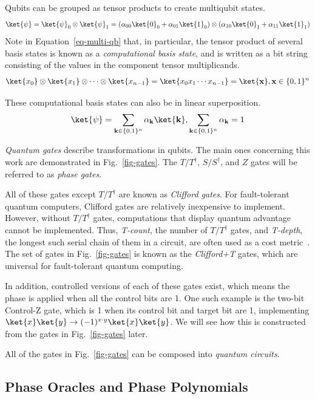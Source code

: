 Qubits can be grouped as tensor products to create multiqubit states.
\begin{equation}
\label{eq-multi-qb}
\ket{\psi} = \ket{\psi}_0 \otimes \ket{\psi}_1 =(\alpha_{00} \ket{0}_0 + \alpha_{01} \ket{1}_0) \otimes
(\alpha_{10} \ket{0}_1 + \alpha_{11} \ket{1}_1)
\end{equation}
Note in Equation~\ref{eq-multi-qb} that, in particular, the tensor product of several basis states is known as a \emph{computational basis state},
and is written as a bit string consisting of the values in the component tensor multiplicands.
\begin{equation}
\ket{x_0}\otimes\ket{x_1}\otimes\cdots\otimes\ket{x_{n-1}}=\ket{x_0 x_1 \cdots x_{n-1}}=\ket{\mathbf{x}},
\mathbf{x} \in \{0,1\}^n
\end{equation}

These computational basis states can also be in linear superposition.
\begin{equation}
\ket{\psi} = \sum_{\mathbf{k} \in \{0,1\}^n} \alpha_{\mathbf{k}}\ket{\mathbf{k}},
\sum_{\mathbf{k} \in \{0,1\}^n} \alpha_{\mathbf{k}} = 1
\end{equation}

{\it Quantum gates} describe transformations in qubits. The main ones concerning this work
are demonstrated in Fig.~\ref{fig-gates}. The $T/T^{\dagger}$, $S/S^{\dagger}$, and $Z$
gates will be referred to as {\it phase gates}.

All of these gates except $T/T^{\dagger}$ are known as {\it Clifford gates}. For
fault-tolerant quantum computers, Clifford gates are relatively inexpensive to implement.
However, without $T/T^{\dagger}$ gates, computations that display quantum advantage
cannot be implemented. Thus, {\it T-count}, the number of $T/T^{\dagger}$ gates, and
{\it T-depth}, the longest such serial chain of them in a circuit, are often used as a
cost metric~\cite{amy-meet-in-middle}. The set of gates in Fig.~\ref{fig-gates} is known
as the {\it Clifford+T} gates, which are universal for fault-tolerant quantum computing.

In addition, controlled versions of each of these gates exist, which means the phase is
applied when all the control bits are 1. One such example is the two-bit Control-Z gate,
which is 1 when its control bit and target bit are 1, implementing
$\ket{x}\ket{y} \rightarrow (-1)^{x \cdot y}\ket{x}\ket{y}$. We will see how this is
constructed from the gates in Fig.~\ref{fig-gates} later.

All of the gates in Fig.~\ref{fig-gates} can be composed into
{\it quantum circuits}.

\subsection{Phase Oracles and Phase Polynomials}
\label{Pre:oracle}
